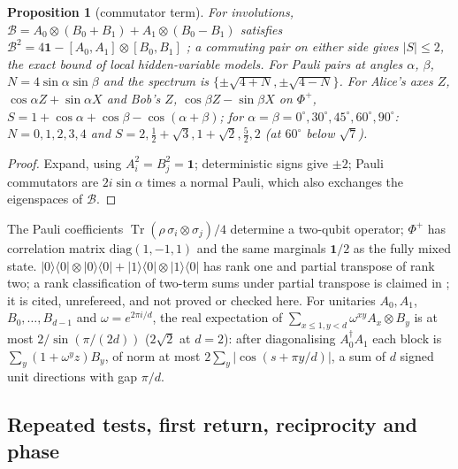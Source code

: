 \documentclass[aps,pra,onecolumn,superscriptaddress,nofootinbib,10pt]{revtex4-2}
\newtheorem{proposition}[theorem]{Proposition}
\theoremstyle{definition}
\theoremstyle{remark}
\newcommand{\tr}{\operatorname{Tr}}
\begin{document}
\begin{proposition}[commutator term]\label{prop:bdlandau}
For involutions, $\mathcal B=A_0\otimes(B_0+B_1)+A_1\otimes(B_0-B_1)$ satisfies $\mathcal B^2=4\mathbf1-[A_0,A_1]\otimes[B_0,B_1]$ \cite{n4:Landau}; a commuting pair on either side
gives $\lvert S\rvert\le2$, the exact bound of local hidden-variable models.  For Pauli pairs at angles $\alpha$, $\beta$, $N=4\sin\alpha\sin\beta$ and the
spectrum is $\{\pm\sqrt{4+N},\pm\sqrt{4-N}\}$.  For Alice's axes $Z$, $\cos\alpha Z+\sin\alpha X$ and Bob's $Z$, $\cos\beta Z-\sin\beta X$ on $\Phi^+$, $S=1+\cos\alpha+\cos\beta-\cos(\alpha+\beta)$;
for $\alpha=\beta=0^\circ,30^\circ,45^\circ,60^\circ,90^\circ$: $N=0,1,2,3,4$ and $S=2,\tfrac12+\sqrt3,1+\sqrt2,\tfrac52,2$ (at $60^\circ$ below $\sqrt7$).
\end{proposition}
\begin{proof}
Expand, using $A_i^2=B_j^2=\mathbf1$; deterministic signs give $\pm2$; Pauli commutators are $2i\sin\alpha$ times a normal Pauli, which also
exchanges the eigenspaces of $\mathcal B$.
\end{proof}
\noindent The Pauli coefficients $\tr(\rho\,\sigma_i\otimes\sigma_j)/4$ determine a two-qubit operator; $\Phi^+$ has correlation matrix $\mathrm{diag}(1,-1,1)$ and the same
marginals $\mathbf1/2$ as the fully mixed state.  $\lvert0\rangle\langle0\rvert\otimes\lvert0\rangle\langle0\rvert+\lvert1\rangle\langle0\rvert\otimes\lvert1\rangle\langle0\rvert$ has rank one and partial transpose of rank two; a rank classification
of two-term sums under partial transpose is claimed in \cite{ub:lean}; it is cited, unrefereed, and not proved or checked here.  For unitaries $A_0,A_1$,
$B_0,\dots,B_{d-1}$ and $\omega=e^{2\pi i/d}$, the real expectation of $\sum_{x\le1,y<d}\omega^{xy}A_x\otimes B_y$ is at most $2/\sin(\pi/(2d))$ ($2\sqrt2$ at $d=2$): after
diagonalising $A_0^\dagger A_1$ each block is $\sum_y(1+\omega^yz)B_y$, of norm at most $2\sum_y\lvert\cos(s+\pi y/d)\rvert$, a sum of $d$ signed unit directions with gap $\pi/d$.

\subsection{Repeated tests, first return, reciprocity and phase}\label{sec:bdmonitor}
\end{document}
